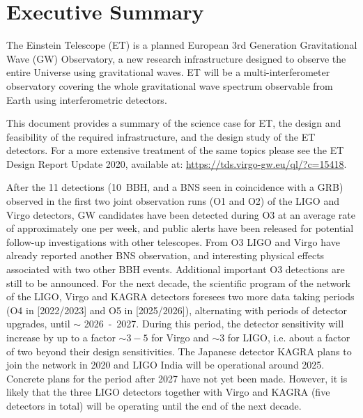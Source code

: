 {\let\clearpage\relax \chapter*{Executive Summary}}\label{chap:Summary}
\noindent The Einstein Telescope (ET) is a planned European 3rd Generation
Gravitational Wave (GW) Observatory, a new research infrastructure designed to observe the entire Universe using gravitational waves. ET will be a multi-interferometer observatory covering the whole gravitational wave spectrum observable from Earth using interferometric detectors. 

\vspace{3mm}
This document provides a summary of the science case for ET, the design and feasibility of the required infrastructure, and the design study of the ET detectors. For a more extensive treatment of the same topics please see the ET Design Report Update 2020, available at: \url{https://tds.virgo-gw.eu/ql/?c=15418}.

\vspace{3mm}
After the 11 detections (10\, BBH,  and a BNS seen in coincidence with a GRB) observed in the first two joint observation runs (O1 and O2) of the LIGO and Virgo detectors, GW candidates have been detected during O3 at an average rate of approximately one per week, and public alerts have been released for potential follow-up investigations with other telescopes. From O3 LIGO and Virgo have already reported another BNS observation, and interesting physical effects associated with two other BBH events. Additional important O3 detections are still to be announced.
For the next decade, the scientific program of the network of the LIGO, Virgo and KAGRA detectors foresees two more data taking periods (O4 in [2022/2023] and O5 in [2025/2026]),
alternating with periods of detector upgrades, until $\sim$ 2026~-~2027. During
this period, the detector sensitivity will increase by up to a factor $\sim 3-5$
for Virgo and $\sim 3$ for LIGO, i.e. about a factor of two
beyond their design sensitivities. The Japanese detector KAGRA plans to join the network
in 2020 and LIGO India will be operational around 2025. Concrete plans for the
period after 2027 have not yet been made. However, it is likely that the three
LIGO detectors together with Virgo and KAGRA (five detectors in total) will be operating until the end of the next decade. 

